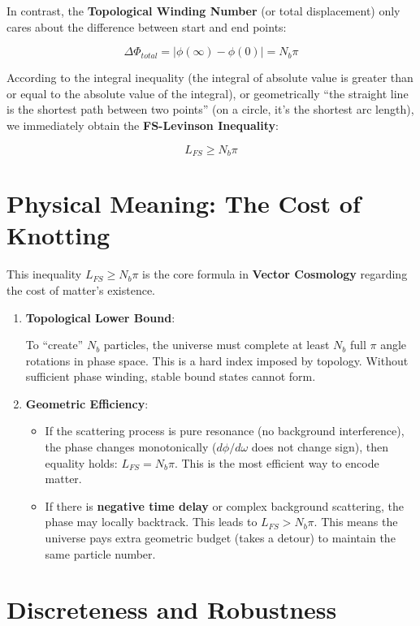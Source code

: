 In contrast, the \textbf{Topological Winding Number} (or total displacement) only cares about the difference between start and end points:

\[\Delta \Phi_{total} = |\phi(\infty) - \phi(0)| = N_b \pi\]

According to the integral inequality (the integral of absolute value is greater than or equal to the absolute value of the integral), or geometrically ``the straight line is the shortest path between two points'' (on a circle, it's the shortest arc length), we immediately obtain the \textbf{FS-Levinson Inequality}:

\[L_{FS} \ge N_b \pi\]

\section{Physical Meaning: The Cost of Knotting}

This inequality $L_{FS} \ge N_b \pi$ is the core formula in \textbf{Vector Cosmology} regarding the cost of matter's existence.

\begin{enumerate}
\item \textbf{Topological Lower Bound}:

    To ``create'' $N_b$ particles, the universe must complete at least $N_b$ full $\pi$ angle rotations in phase space. This is a hard index imposed by topology. Without sufficient phase winding, stable bound states cannot form.

\item \textbf{Geometric Efficiency}:

    \begin{itemize}
    \item If the scattering process is pure resonance (no background interference), the phase changes monotonically ($d\phi/d\omega$ does not change sign), then equality holds: $L_{FS} = N_b \pi$. This is the most efficient way to encode matter.

    \item If there is \textbf{negative time delay} or complex background scattering, the phase may locally backtrack. This leads to $L_{FS} > N_b \pi$. This means the universe pays extra geometric budget (takes a detour) to maintain the same particle number.
    \end{itemize}
\end{enumerate}

\section{Discreteness and Robustness}

